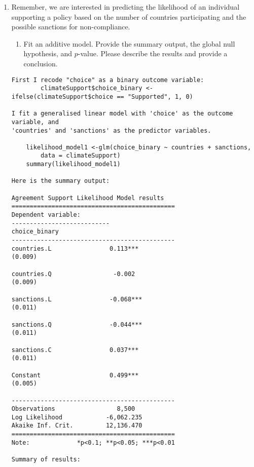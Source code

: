 \documentclass[12pt,letterpaper]{article}
\begin{document}
\begin{enumerate}
	\item
	Remember, we are interested in predicting the likelihood of an individual supporting a policy based on the number of countries participating and the possible sanctions for non-compliance.
	\begin{enumerate}
		\item [] Fit an additive model. Provide the summary output, the global null hypothesis, and $p$-value. Please describe the results and provide a conclusion.
	\end{enumerate}
	
	\begin{verbatim}
First I recode "choice" as a binary outcome variable:
		climateSupport$choice_binary <- ifelse(climateSupport$choice == "Supported", 1, 0)
		
I fit a generalised linear model with 'choice' as the outcome variable, and
'countries' and 'sanctions' as the predictor variables.

	likelihood_model1 <-glm(choice_binary ~ countries + sanctions,
		data = climateSupport)
	summary(likelihood_model1)

Here is the summary output:

Agreement Support Likelihood Model results
=============================================
Dependent variable:    
---------------------------
choice_binary       
---------------------------------------------
countries.L                0.113***          
(0.009)          

countries.Q                 -0.002           
(0.009)          

sanctions.L                -0.068***         
(0.011)          

sanctions.Q                -0.044***         
(0.011)          

sanctions.C                0.037***          
(0.011)          

Constant                   0.499***          
(0.005)          

---------------------------------------------
Observations                 8,500           
Log Likelihood            -6,062.235         
Akaike Inf. Crit.         12,136.470         
=============================================
Note:             *p<0.1; **p<0.05; ***p<0.01

Summary of results:


\end{verbatim}
\end{enumerate}
\end{document}
